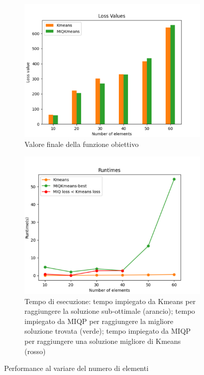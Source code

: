 \documentclass{article}
\begin{document}
    \begin{figure}[H]
     \centering
     \begin{subfigure}[t]{0.49\linewidth}
         \centering
         \includegraphics[width=\linewidth]{../results/plots/loss_size_heart}
         \caption{Valore finale della funzione obiettivo}
     \end{subfigure}
     \hfill
     \begin{subfigure}[t]{0.48\linewidth}
         \centering
         \includegraphics[width=\linewidth]{../results/plots/runtime_size_heart}
         \caption{Tempo di esecuzione: tempo impiegato da Kmeans per raggiungere la soluzione sub-ottimale (arancio); tempo impiegato da MIQP per raggiungere la migliore soluzione trovata (verde); tempo impiegato da MIQP per raggiungere una soluzione migliore di Kmeans (rosso)}
     \end{subfigure}
        \label{fig:7}
        \caption{Performance al variare del numero di elementi}
     \end{figure}
\end{document}
